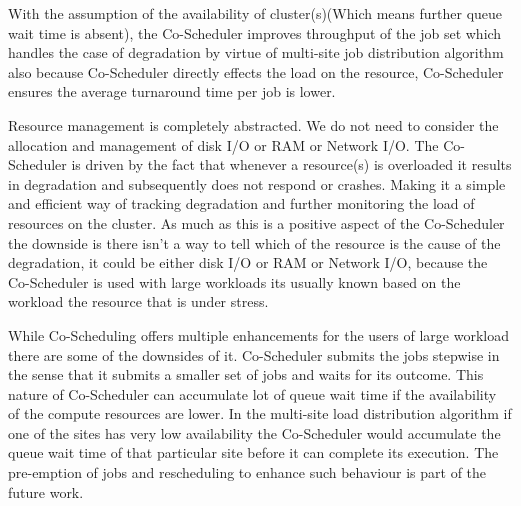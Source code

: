 \documentclass[ms,electronic,double]{nuthesis}
\begin{document}
With the assumption of the availability of cluster(s)(Which means further queue wait time is 
absent), the Co-Scheduler improves throughput of the job set which handles the 
case of degradation by virtue of multi-site job distribution algorithm also 
because Co-Scheduler directly effects the load on the resource, Co-Scheduler 
ensures the average turnaround time per job is lower.

Resource management is completely abstracted. We do not need to consider the 
allocation and management of disk I/O or RAM or Network I/O. The Co-Scheduler is 
driven by the fact that whenever a resource(s) is overloaded it results in 
degradation and subsequently does not respond or crashes. Making it a simple and 
efficient way of tracking degradation and further monitoring the load of 
resources on the cluster. As much as this is a positive aspect of the 
Co-Scheduler the downside is there isn't a way to tell which of the resource is 
the cause of the degradation, it could be either disk I/O or RAM or Network I/O, 
because the Co-Scheduler is used with large workloads its usually known based on 
the workload the resource that is under stress.

While Co-Scheduling offers multiple enhancements for the users of large workload 
there are some of the downsides of it. Co-Scheduler submits the jobs stepwise in 
the sense that it submits a smaller set of jobs and waits for its outcome. This 
nature of Co-Scheduler can accumulate lot of queue wait time if the availability 
of the compute resources are lower. In the multi-site load distribution 
algorithm if one of the sites has very low availability the Co-Scheduler would 
accumulate the queue wait time of that particular site before it can complete 
its execution. The pre-emption of jobs and rescheduling to enhance such 
behaviour is part of the future work.

\backmatter

\appendix




\nocite{*}

\end{document}
